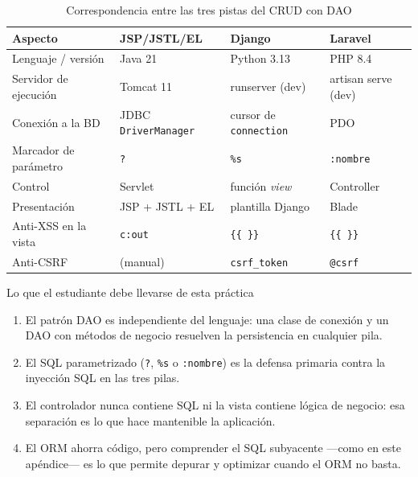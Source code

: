 \documentclass[11pt,a4paper,openany]{book}
\begin{document}
\begin{table}[H]
\centering
\caption{Correspondencia entre las tres pistas del CRUD con DAO}
\label{tab:crud-comparacion}
\small
\renewcommand{\arraystretch}{1.3}
\begin{tabular}{>{\raggedright\arraybackslash}p{2.8cm}
                >{\raggedright\arraybackslash}p{3.4cm}
                >{\raggedright\arraybackslash}p{3.2cm}
                >{\raggedright\arraybackslash}p{3.2cm}}
\toprule
\textbf{Aspecto} & \textbf{JSP/JSTL/EL} & \textbf{Django} & \textbf{Laravel} \\
\midrule
Lenguaje / versión & Java 21 & Python 3.13 & PHP 8.4 \\
Servidor de ejecución & Tomcat 11 & runserver (dev) & artisan serve (dev) \\
Conexión a la BD & JDBC \texttt{DriverManager} & cursor de \texttt{connection} & PDO \\
Marcador de parámetro & \texttt{?} & \texttt{\%s} & \texttt{:nombre} \\
Control & Servlet & función \emph{view} & Controller \\
Presentación & JSP + JSTL + EL & plantilla Django & Blade \\
Anti-XSS en la vista & \texttt{c:out} & \texttt{\{\{ \}\}} & \texttt{\{\{ \}\}} \\
Anti-CSRF & (manual) & \texttt{csrf\_token} & \texttt{@csrf} \\
\bottomrule
\end{tabular}
\end{table}

\begin{cajabuenas}{Lo que el estudiante debe llevarse de esta práctica}
\begin{enumerate}
\item El patrón DAO es independiente del lenguaje: una clase de
conexión y un DAO con métodos de negocio resuelven la persistencia en
cualquier pila.
\item El SQL parametrizado (\texttt{?}, \texttt{\%s} o \texttt{:nombre})
es la defensa primaria contra la inyección SQL en las tres pilas.
\item El controlador nunca contiene SQL ni la vista contiene lógica de
negocio: esa separación es lo que hace mantenible la aplicación.
\item El ORM ahorra código, pero comprender el SQL subyacente ---como
en este apéndice--- es lo que permite depurar y optimizar cuando el ORM
no basta.
\end{enumerate}
\end{cajabuenas}
\end{document}
